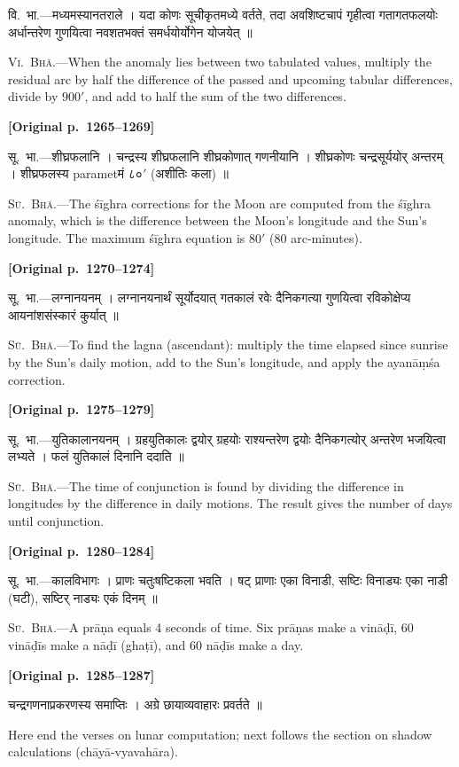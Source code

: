 \documentclass[11pt,a4paper]{article}
\newcommand{\dev}[1]{{\devanagarifont\mdseries\upshape #1}}
\newcommand{\pagelabel}[1]{\textcolor{sectioncolor}{\textbf{[Original p.~#1]}}}
\newcommand{\bilingualpair}[2]{%
  \noindent%
  \begin{minipage}[t]{0.47\textwidth}
    \begin{flushleft}
      \small\dev{#1}
    \end{flushleft}
  \end{minipage}%
  \hfill\vrule\hfill%
  \begin{minipage}[t]{0.47\textwidth}
    \begin{flushleft}
      \small #2
    \end{flushleft}
  \end{minipage}%
  \par\vspace{1.2ex}
}
\begin{document}
\bilingualpair{%
वि.~भा.---मध्यमस्यानतराले । यदा कोणः सूचीकृतमध्ये वर्तते, तदा अवशिष्टचापं गृहीत्वा गतागतफलयोः अर्धान्तरेण गुणयित्वा नवशतभक्तं समर्धयोर्योगेन योजयेत् ॥
}{%
\textsc{Vi.~Bhā.}---When the anomaly lies between two tabulated values, multiply the residual arc by half the difference of the passed and upcoming tabular differences, divide by $900'$, and add to half the sum of the two differences.
}

\vspace{0.5ex}
\pagelabel{1265--1269}

\bilingualpair{%
सू.~भा.---शीघ्रफलानि । चन्द्रस्य शीघ्रफलानि शीघ्रकोणात् गणनीयानि । शीघ्रकोणः चन्द्रसूर्ययोर् अन्तरम् । शीघ्रफलस्य parametमं $८०'$ (अशीतिः कला) ॥
}{%
\textsc{Sū.~Bhā.}---The śīghra corrections for the Moon are computed from the śīghra anomaly, which is the difference between the Moon's longitude and the Sun's longitude. The maximum śīghra equation is $80'$ (80 arc-minutes).
}

\vspace{0.5ex}
\pagelabel{1270--1274}

\bilingualpair{%
सू.~भा.---लग्नानयनम् । लग्नानयनार्थं सूर्योदयात् गतकालं रवेः दैनिकगत्या गुणयित्वा रविकोक्षेप्य आयनांशसंस्कारं कुर्यात् ॥
}{%
\textsc{Sū.~Bhā.}---To find the lagna (ascendant): multiply the time elapsed since sunrise by the Sun's daily motion, add to the Sun's longitude, and apply the ayanāṃśa correction.
}

\vspace{0.5ex}
\pagelabel{1275--1279}

\bilingualpair{%
सू.~भा.---युतिकालानयनम् । ग्रहयुतिकालः द्वयोर् ग्रहयोः राश्यन्तरेण द्वयोः दैनिकगत्योर् अन्तरेण भजयित्वा लभ्यते । फलं युतिकालं दिनानि ददाति ॥
}{%
\textsc{Sū.~Bhā.}---The time of conjunction is found by dividing the difference in longitudes by the difference in daily motions. The result gives the number of days until conjunction.
}

\vspace{0.5ex}
\pagelabel{1280--1284}

\bilingualpair{%
सू.~भा.---कालविभागः । प्राणः चतुःषष्टिकला भवति । षट् प्राणाः एका विनाडी, सष्टिः विनाड्यः एका नाडी (घटी), सष्टिर् नाड्यः एकं दिनम् ॥
}{%
\textsc{Sū.~Bhā.}---A prāṇa equals 4 seconds of time. Six prāṇas make a vināḍī, 60 vināḍīs make a nāḍī (ghaṭī), and 60 nāḍīs make a day.
}

\vspace{0.5ex}
\pagelabel{1285--1287}

\bilingualpair{%
चन्द्रगणनाप्रकरणस्य समाप्तिः । अग्रे छायाव्यवाहारः प्रवर्तते ॥
}{%
Here end the verses on lunar computation; next follows the section on shadow calculations (chāyā-vyavahāra).
}
\end{document}
